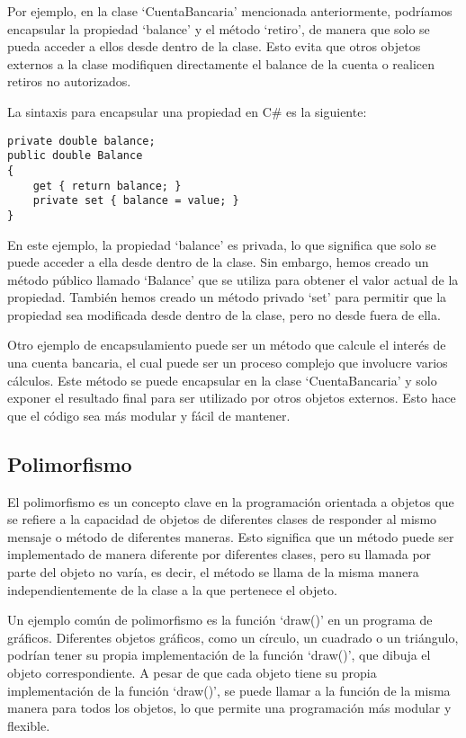 \documentclass[executivepaper]{article}
\begin{document}
Por ejemplo, en la clase \enquote*{CuentaBancaria} mencionada anteriormente, podríamos encapsular la propiedad \enquote*{balance} y el método \enquote*{retiro}, de manera que solo se pueda acceder a ellos desde dentro de la clase. Esto evita que otros objetos externos a la clase modifiquen directamente el balance de la cuenta o realicen retiros no autorizados.

La sintaxis para encapsular una propiedad en C\# es la siguiente:
\begin{lstlisting}
private double balance;
public double Balance
{
    get { return balance; }
    private set { balance = value; }
}
\end{lstlisting}
En este ejemplo, la propiedad \enquote*{balance} es privada, lo que significa que solo se puede acceder a ella desde dentro de la clase. Sin embargo, hemos creado un método público llamado \enquote*{Balance} que se utiliza para obtener el valor actual de la propiedad. También hemos creado un método privado \enquote*{set} para permitir que la propiedad sea modificada desde dentro de la clase, pero no desde fuera de ella.

Otro ejemplo de encapsulamiento puede ser un método que calcule el interés de una cuenta bancaria, el cual puede ser un proceso complejo que involucre varios cálculos. Este método se puede encapsular en la clase \enquote*{CuentaBancaria} y solo exponer el resultado final para ser utilizado por otros objetos externos. Esto hace que el código sea más modular y fácil de mantener.

\subsection{Polimorfismo}

El polimorfismo es un concepto clave en la programación orientada a objetos que se refiere a la capacidad de objetos de diferentes clases de responder al mismo mensaje o método de diferentes maneras. Esto significa que un método puede ser implementado de manera diferente por diferentes clases, pero su llamada por parte del objeto no varía, es decir, el método se llama de la misma manera independientemente de la clase a la que pertenece el objeto.

Un ejemplo común de polimorfismo es la función \enquote*{draw()} en un programa de gráficos. Diferentes objetos gráficos, como un círculo, un cuadrado o un triángulo, podrían tener su propia implementación de la función \enquote*{draw()}, que dibuja el objeto correspondiente. A pesar de que cada objeto tiene su propia implementación de la función \enquote*{draw()}, se puede llamar a la función de la misma manera para todos los objetos, lo que permite una programación más modular y flexible.
\end{document}
